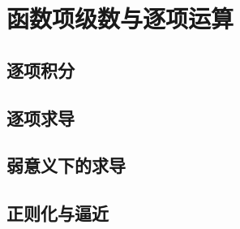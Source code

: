 \section{函数项级数与逐项运算}
\label{b2:sec:0206}


\subsection{逐项积分}
\label{b2:subsec:020601}

\subsection{逐项求导}
\label{b2:subsec:020602}

\subsection{弱意义下的求导}
\label{b2:subsec:020603}

\subsection{正则化与逼近}
\label{b2:subsec:020604}


